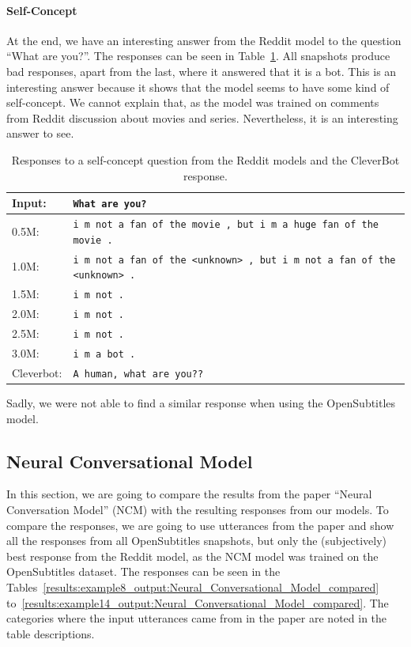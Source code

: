 \paragraph{Self-Concept} At the end, we have an interesting answer from the Reddit model to the question ``What are you?''. The responses can be seen in Table~\ref{results:example7_output:Reddit_compared}. All snapshots produce bad responses, apart from the last, where it answered that it is a bot. This is an interesting answer because it shows that the model seems to have some kind of self-concept. We cannot explain that, as the model was trained on comments from Reddit discussion about movies and series. Nevertheless, it is an interesting answer to see.

\begin{table}[H]
	\centering
	\begin{adjustbox}{max width=\textwidth}
		\begin{tabular}{ll}
			\toprule
			Input: 	& \texttt{What are you?}\\
			\midrule
			0.5M: 	& \texttt{i m not a fan of the movie , but i m a huge fan of the movie .}\\
			1.0M: 	& \texttt{i m not a fan of the <unknown> , but i m not a fan of the <unknown> .}\\
			1.5M:	& \texttt{i m not .}\\
			2.0M:	& \texttt{i m not .}\\
			2.5M:	& \texttt{i m not .}\\
			3.0M:	& \texttt{i m a bot .}\\
			Cleverbot:	& \texttt{A human, what are you??}\\
			\bottomrule
		\end{tabular}
	\end{adjustbox}
	\caption{Responses to a self-concept question from the Reddit models and the CleverBot response.}
	\label{results:example7_output:Reddit_compared}
\end{table}

Sadly, we were not able to find a similar response when using the OpenSubtitles model.

\subsection{Neural Conversational Model}
\label{results:comparison:ncm}
In this section, we are going to compare the results from the paper ``Neural Conversation Model'' (NCM) with the resulting responses from our models. To compare the responses, we are going to use utterances from the paper and show all the responses from all OpenSubtitles snapshots, but only the (subjectively) best response from the Reddit model, as the NCM model was trained on the OpenSubtitles dataset. The responses can be seen in the Tables~\ref{results:example8_output:Neural_Conversational_Model_compared} to~\ref{results:example14_output:Neural_Conversational_Model_compared}. The categories where the input utterances came from in the paper are noted in the table descriptions.

